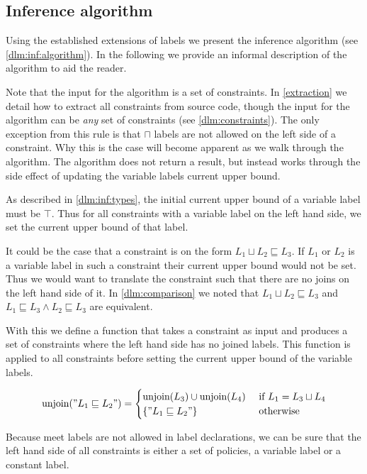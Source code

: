 \subsection{Inference algorithm}\label{dlm:inf:algsection}
Using the established extensions of labels we present the inference algorithm (see \cref{dlm:inf:algorithm}).
In the following we provide an informal description of the algorithm to aid the reader.

Note that the input for the algorithm is a set of constraints.
In \cref{extraction} we detail how to extract all constraints from source code, though the input for the algorithm can be \textit{any} set of constraints (see \cref{dlm:constraints}).
The only exception from this rule is that $\sqcap$ labels are not allowed on the left side of a constraint.
Why this is the case will become apparent as we walk through the algorithm.
The algorithm does not return a result, but instead works through the side effect of updating the variable labels current upper bound.



As described in \cref{dlm:inf:types}, the initial current upper bound of a variable label must be $\top$.
Thus for all constraints with a variable label on the left hand side, we set the current upper bound of that label.

It could be the case that a constraint is on the form $L_1 \sqcup L_2 \sqsubseteq L_3$.
If $L_1$ or $L_2$ is a variable label in such a constraint their current upper bound would not be set.
Thus we would want to translate the constraint such that there are no joins on the left hand side of it.
In \cref{dlm:comparison} we noted that $L_1 \sqcup L_2 \sqsubseteq L_3$ and $L_1 \sqsubseteq L_3 \wedge L_2 \sqsubseteq L_3$ are equivalent.

With this we define a function that takes a constraint as input and produces a set of constraints where the left hand side has no joined labels.
This function is applied to all constraints before setting the current upper bound of the variable labels.

\[
\text{unjoin}("L_1 \sqsubseteq L_2") =
\begin{cases}
  \text{unjoin}(L_3) \cup \text{unjoin}(L_4) & \text{ if } L_1 = L_3 \sqcup L_4\\
  \{"L_1 \sqsubseteq L_2"\} & \text{ otherwise}
\end{cases}
\]

Because meet labels are not allowed in label declarations, we can be sure that the left hand side of all constraints is either a set of policies, a variable label or a constant label.


